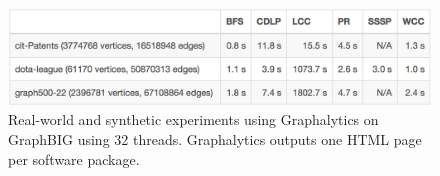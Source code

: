 \documentclass[conference]{IEEEtran}
\begin{document}
\begin{figure}
	\includegraphics[width=\linewidth, trim=0 18pt 6pt 0pt, clip]{graphics/graphalytics-GraphBIG.png}
	\caption{Real-world and synthetic experiments using Graphalytics on GraphBIG using 32 threads. Graphalytics outputs one HTML page per software package.}
	\label{fig:graphalytics-html}
\end{figure}
\end{document}
